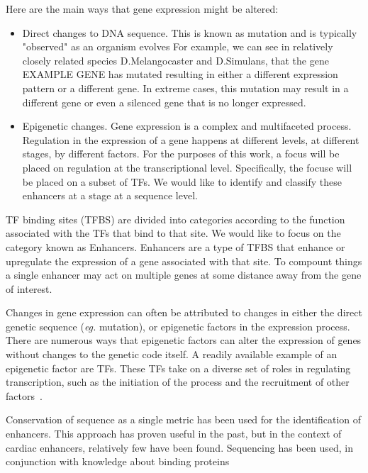 Here are the main ways that gene expression might be altered:
\begin{itemize}
	\item Direct changes to DNA sequence. This is known as mutation and is typically "observed" as an organism evolves
		For example, we can see in relatively closely related species D.Melangocaster and D.Simulans, that the
		gene EXAMPLE GENE has mutated resulting in either a different expression pattern or a different gene.
		In extreme cases, this mutation may result in a different gene or even a silenced gene that is no longer
		expressed.
	\item Epigenetic changes. Gene expression is a complex and multifaceted process. Regulation in the expression
		of a gene happens at different levels, at different stages, by different factors. For the purposes
		of this work, a focus will be placed on regulation at the transcriptional level. Specifically, the focuse
		will be placed on a subset of TFs. We would like to identify and classify these enhancers at a stage
		at a sequence level.
\end{itemize}
        
TF binding sites (TFBS) are divided into categories according to the function associated with the TFs that bind to that site.
We would like to focus on the category known as Enhancers. Enhancers are a type of TFBS that enhance or upregulate the 
expression of a gene associated with that site.
To compount things a single enhancer may act on multiple genes at some distance away from the gene of interest. 


        Changes in gene expression can often be attributed to changes in either the direct genetic sequence (\emph{eg.} mutation), or epigenetic factors in the expression process. There are numerous ways that epigenetic factors can alter the expression of genes without changes to the genetic code itself. A readily available example of an epigenetic factor are TFs. These TFs take on a diverse set of roles in regulating transcription, such as the initiation of the process and the recruitment of other factors~\cite{lemon2000orchestrated}.
        
        
        Conservation of sequence as a single metric has been used for the identification of enhancers. This approach has proven useful in the past, but in the context of cardiac enhancers, relatively few have been found. Sequencing has been used, in conjunction with knowledge about binding proteins~\cite{blow2010chip}
        
